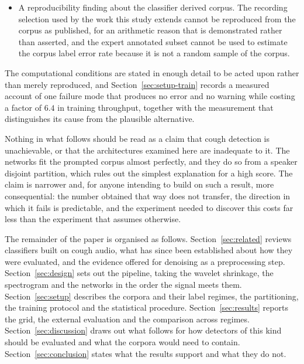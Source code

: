 \begin{itemize}
\item A reproducibility finding about the classifier derived corpus. The recording
      selection used by the work this study extends cannot be reproduced from the corpus as
      published, for an arithmetic reason that is demonstrated rather than asserted, and
      the expert annotated subset cannot be used to estimate the corpus label error rate
      because it is not a random sample of the corpus.

\end{itemize}

The computational conditions are stated in enough detail to be acted upon rather than
merely reproduced, and Section~\ref{sec:setup-train} records a measured account of one
failure mode that produces no error and no warning while costing a factor of $6.4$ in
training throughput, together with the measurement that distinguishes its cause from the
plausible alternative.

Nothing in what follows should be read as a claim that cough detection is unachievable, or
that the architectures examined here are inadequate to it. The networks fit the prompted
corpus almost perfectly, and they do so from a speaker disjoint partition, which rules out
the simplest explanation for a high score. The claim is narrower and, for anyone intending
to build on such a result, more consequential: the number obtained that way does not
transfer, the direction in which it fails is predictable, and the experiment needed to
discover this costs far less than the experiment that assumes otherwise.

The remainder of the paper is organised as follows.
Section~\ref{sec:related} reviews classifiers built on cough audio, what has since been
established about how they were evaluated, and the evidence offered for denoising as a
preprocessing step. Section~\ref{sec:design} sets out the pipeline, taking the wavelet
shrinkage, the spectrogram and the networks in the order the signal meets them.
Section~\ref{sec:setup} describes the corpora and their label regimes, the partitioning,
the training protocol and the statistical procedure. Section~\ref{sec:results} reports the
grid, the external evaluation and the comparison across regimes.
Section~\ref{sec:discussion} draws out what follows for how detectors of this kind should
be evaluated and what the corpora would need to contain.
Section~\ref{sec:conclusion} states what the results support and what they do not.
